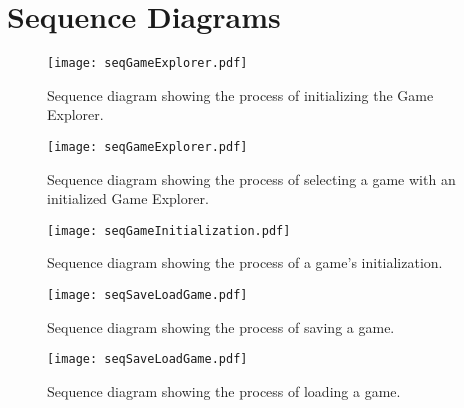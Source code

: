 \section{Sequence Diagrams}

\begin{figure}[h]
	\centering
	\texttt{[image: seqGameExplorer.pdf]}
	\caption{Sequence diagram showing the process of initializing the Game Explorer.}
	\label{img:seqGameExplorer}
\end{figure}

\begin{figure}[h]
	\centering
	\texttt{[image: seqGameExplorer.pdf]}
	\caption{Sequence diagram showing the process of selecting a game with an initialized Game Explorer.}
	\label{img:seqGameExplorer}
\end{figure}

\begin{figure}[h]
	\centering
	\texttt{[image: seqGameInitialization.pdf]}
	\caption{Sequence diagram showing the process of a game's initialization.}
	\label{img:seqGameInitialization}
\end{figure}

\begin{figure}[h]
	\centering
	\texttt{[image: seqSaveLoadGame.pdf]}
	\caption{Sequence diagram showing the process of saving a game.}
	\label{img:seqSaveLoadGame}
\end{figure}

\begin{figure}[h]
	\centering
	\texttt{[image: seqSaveLoadGame.pdf]}
	\caption{Sequence diagram showing the process of loading a game.}
	\label{img:seqSaveLoadGame}
\end{figure}
